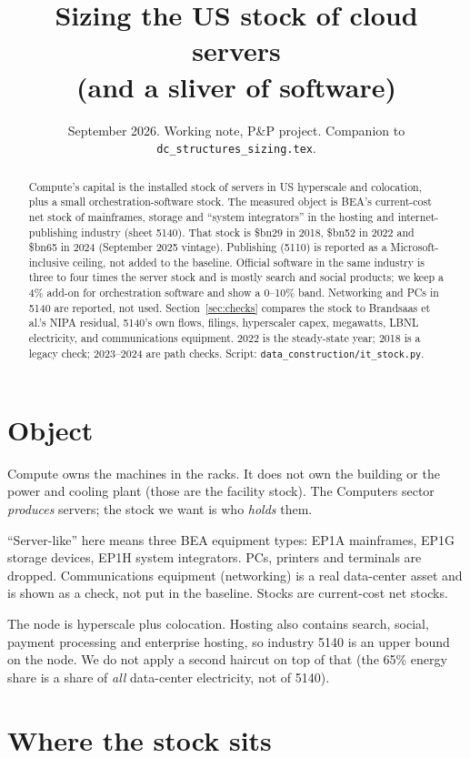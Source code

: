 \documentclass[11pt]{article}
\title{Sizing the US stock of cloud servers\\ (and a sliver of software)}
\author{}
\date{September 2026. Working note, P\&P project. Companion to \texttt{dc\_structures\_sizing.tex}.}
\newcommand{\bn}{\$bn}
\begin{document}
\maketitle

\begin{abstract}
\noindent Compute's capital is the installed stock of servers in US hyperscale and colocation, plus a small orchestration-software stock. The measured object is BEA's current-cost net stock of mainframes, storage and ``system integrators'' in the hosting and internet-publishing industry (sheet 5140). That stock is \bn29 in 2018, \bn52 in 2022 and \bn65 in 2024 (September 2025 vintage). Publishing (5110) is reported as a Microsoft-inclusive ceiling, not added to the baseline. Official software in the same industry is three to four times the server stock and is mostly search and social products; we keep a 4\% add-on for orchestration software and show a 0--10\% band. Networking and PCs in 5140 are reported, not used. Section~\ref{sec:checks} compares the stock to Brandsaas et al.'s NIPA residual, 5140's own flows, filings, hyperscaler capex, megawatts, LBNL electricity, and communications equipment. 2022 is the steady-state year; 2018 is a legacy check; 2023--2024 are path checks. Script: \texttt{data\_construction/it\_stock.py}.
\end{abstract}

\section{Object}

Compute owns the machines in the racks. It does not own the building or the power and cooling plant (those are the facility stock). The Computers sector \emph{produces} servers; the stock we want is who \emph{holds} them.

``Server-like'' here means three BEA equipment types: EP1A mainframes, EP1G storage devices, EP1H system integrators. PCs, printers and terminals are dropped. Communications equipment (networking) is a real data-center asset and is shown as a check, not put in the baseline. Stocks are current-cost net stocks.

The node is hyperscale plus colocation. Hosting also contains search, social, payment processing and enterprise hosting, so industry 5140 is an upper bound on the node. We do not apply a second haircut on top of that (the 65\% energy share is a share of \emph{all} data-center electricity, not of 5140).

\section{Where the stock sits}
\end{document}
